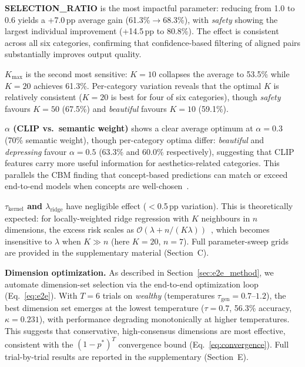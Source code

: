 \documentclass[runningheads]{llncs}
\begin{document}
\noindent\textbf{SELECTION\_RATIO} is the most impactful parameter: reducing from 1.0 to 0.6 yields a +7.0\,pp average gain (61.3\%$\to$68.3\%), with \emph{safety} showing the largest individual improvement (+14.5\,pp to 80.8\%).
The effect is consistent across all six categories, confirming that confidence-based filtering of aligned pairs substantially improves output quality.

\noindent\textbf{$K_{\max}$} is the second most sensitive: $K{=}10$ collapses the average to 53.5\% while $K{=}20$ achieves 61.3\%.
Per-category variation reveals that the optimal $K$ is relatively consistent ($K{=}20$ is best for four of six categories), though \emph{safety} favours $K{=}50$ (67.5\%) and \emph{beautiful} favours $K{=}10$ (59.1\%).

\noindent\textbf{$\alpha$ (CLIP vs.\ semantic weight)} shows a clear average optimum at $\alpha{=}0.3$ (70\% semantic weight), though per-category optima differ: \emph{beautiful} and \emph{depressing} favour $\alpha{=}0.5$ (63.3\% and 60.0\% respectively), suggesting that CLIP features carry more useful information for aesthetics-related categories.
This parallels the CBM finding that concept-based predictions can match or exceed end-to-end models when concepts are well-chosen~\cite{koh2020concept}.

\noindent\textbf{$\tau_{\mathrm{kernel}}$ and $\lambda_{\mathrm{ridge}}$} have negligible effect ($<$0.5\,pp variation).
This is theoretically expected: for locally-weighted ridge regression with $K$ neighbours in $n$ dimensions, the excess risk scales as $\mathcal{O}(\lambda + n/(K\lambda))$~\cite{caponnetto2007optimal}, which becomes insensitive to $\lambda$ when $K \gg n$ (here $K{=}20$, $n{=}7$).
Full parameter-sweep grids are provided in the supplementary material (Section~C).

\smallskip\noindent\textbf{Dimension optimization.}
As described in Section~\ref{sec:e2e_method}, we automate dimension-set selection via the end-to-end optimization loop (Eq.~\eqref{eq:e2e}).
With $T{=}6$ trials on \emph{wealthy} (temperatures $\tau_{\mathrm{gen}}{=}0.7$--$1.2$), the best dimension set emerges at the lowest temperature ($\tau{=}0.7$, 56.3\% accuracy, $\kappa{=}0.231$), with performance degrading monotonically at higher temperatures.
This suggests that conservative, high-consensus dimensions are most effective, consistent with the $(1{-}p^*)^T$ convergence bound (Eq.~\eqref{eq:convergence}).
Full trial-by-trial results are reported in the supplementary (Section~E).
\end{document}

